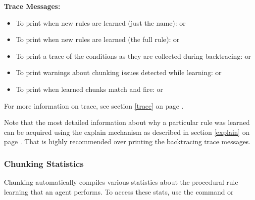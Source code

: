 \textbf{Trace Messages:}
\begin{itemize}
	\item To print when new rules are learned (just the name): \newline {} or  
	\item To print when new rules are learned (the full rule): \newline {} or  
	\item To print a trace of the conditions as they are collected during backtracing: \newline {} or  
	\item To print warnings about chunking issues detected while learning:  \newline {} or 
	\item To print when learned chunks match and fire: \newline  {} or  
\end{itemize}
For more information on trace, see section \ref{trace} on page \pageref{trace}.

Note that the most detailed information about why a particular rule was learned can be acquired using the explain mechanism as described in section \ref{explain} on page \pageref{explain}.  That is highly recommended over printing the backtracing trace messages.

\subsubsection{Chunking Statistics}

Chunking automatically compiles various statistics about the procedural rule learning that an agent performs.  To access these stats, use the command  or 


